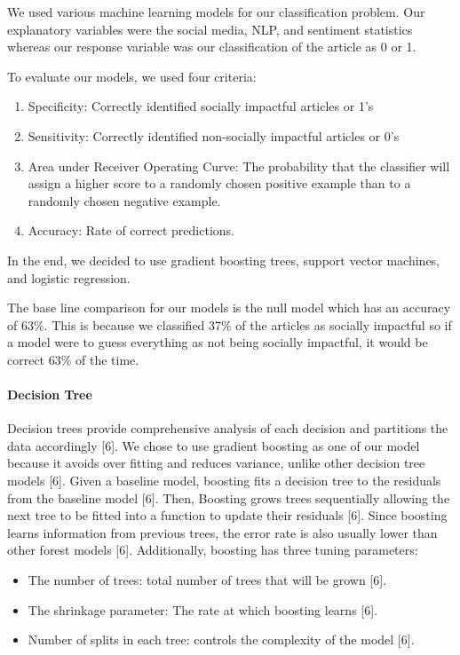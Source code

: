 \documentclass[10pt,letterpaper]{article}
\providecommand{\tightlist}{%
  \setlength{\itemsep}{0pt}\setlength{\parskip}{0pt}}
\begin{document}
We used various machine learning models for our classification problem.
Our explanatory variables were the social media, NLP, and sentiment
statistics whereas our response variable was our classification of the
article as 0 or 1.

To evaluate our models, we used four criteria:

\begin{enumerate}
\def\labelenumi{\arabic{enumi}.}
\tightlist
\item
  Specificity: Correctly identified socially impactful articles or 1's
\item
  Sensitivity: Correctly identified non-socially impactful articles or
  0's
\item
  Area under Receiver Operating Curve: The probability that the
  classifier will assign a higher score to a randomly chosen positive
  example than to a randomly chosen negative example.
\item
  Accuracy: Rate of correct predictions.
\end{enumerate}

In the end, we decided to use gradient boosting trees, support vector
machines, and logistic regression.

The base line comparison for our models is the null model which has an
accuracy of 63\%. This is because we classified 37\% of the articles as
socially impactful so if a model were to guess everything as not being
socially impactful, it would be correct 63\% of the time.

\hypertarget{decision-tree}{%
\paragraph{Decision Tree}\label{decision-tree}}

Decision trees provide comprehensive analysis of each decision and
partitions the data accordingly {[}6{]}. We chose to use gradient
boosting as one of our model because it avoids over fitting and reduces
variance, unlike other decision tree models {[}6{]}. Given a baseline
model, boosting fits a decision tree to the residuals from the baseline
model {[}6{]}. Then, Boosting grows trees sequentially allowing the next
tree to be fitted into a function to update their residuals {[}6{]}.
Since boosting learns information from previous trees, the error rate is
also usually lower than other forest models {[}6{]}. Additionally,
boosting has three tuning parameters:

\begin{itemize}
\tightlist
\item
  The number of trees: total number of trees that will be grown {[}6{]}.
\item
  The shrinkage parameter: The rate at which boosting learns {[}6{]}.
\item
  Number of splits in each tree: controls the complexity of the model
  {[}6{]}.
\end{itemize}
\end{document}
